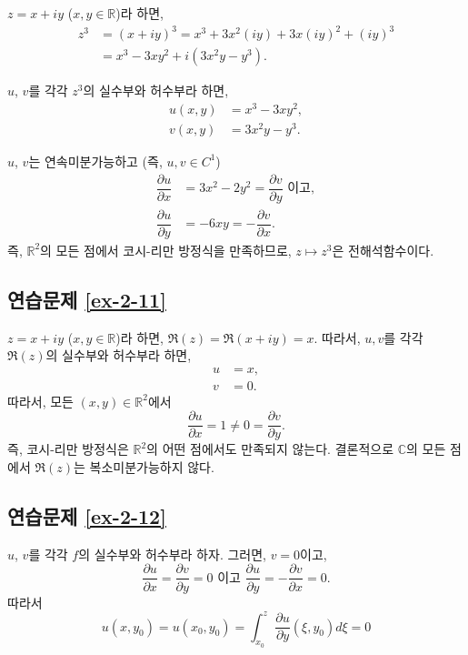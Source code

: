 $z = x+iy$ ($x,y\in\mathbb R$)라 하면,
\begin{align*}
z^3 &= (x+iy)^3 = x^3 + 3x^2(iy) + 3x(iy)^2 + (iy)^3 \\
&= x^3 - 3xy^2 + i(3x^2y-y^3).
\end{align*}

$u$, $v$를 각각 $z^3$의 실수부와 허수부라 하면,
\begin{align*}
u(x,y) &= x^3 -3xy^2, \\
v(x,y) &= 3x^2y - y^3.
\end{align*}

$u$, $v$는 연속미분가능하고 (즉, $u,v\in C^1$)
\begin{align*}
\dfrac{\partial u}{\partial x} &= 3x^2 -2y^2 = \dfrac{\partial v}{\partial y} \text{ 이고}, \\
\dfrac{\partial u}{\partial y} &= -6xy = - \dfrac{\partial v}{\partial x}.
\end{align*}
즉, $\mathbb R^2$의 모든 점에서 코시-리만 방정식을 만족하므로,
$z\mapsto z^3$은 전해석함수이다.

\subsection*{연습문제 \ref{ex-2-11}}

$z = x+iy$ ($x,y\in\mathbb R$)라 하면,
$\Re(z) = \Re(x+iy) = x$.
따라서, $u, v$를 각각 $\Re(z)$의 실수부와 허수부라 하면,
\begin{align*}
u & =x, \\
v &=0.
\end{align*}
따라서, 모든 $(x,y) \in \mathbb R^2$에서
\[
\dfrac{\partial u}{\partial x}  = 1 \ne 0 =  \dfrac{\partial v}{\partial y}.
\]
즉, 코시-리만 방정식은 $\mathbb R^2$의 어떤 점에서도 만족되지 않는다.
결론적으로 $\mathbb C$의 모든 점에서 $\Re(z)$는 복소미분가능하지 않다.

\subsection*{연습문제 \ref{ex-2-12}}

$u$, $v$를 각각 $f$의 실수부와 허수부라 하자. 
그러면, $v=0$이고,
\[
\dfrac{\partial u}{\partial x} = \dfrac{\partial v}{\partial y} = 0
\text{ 이고 }
\dfrac{\partial u}{\partial y} = - \dfrac{\partial v}{\partial x} = 0.
\]
따라서 
\[
u(x,y_0) = u(x_0,y_0) = \int_{x_0}^z \dfrac{\partial u}{\partial y}(\xi, y_0) d\xi = 0
\]







%


